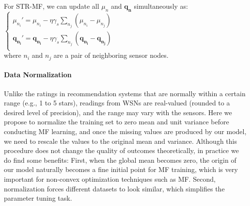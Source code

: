 For STR-MF, we can update all $\mu_n$ and $\mathbf{q_n}$ simultaneously as:\\
\indent $\begin{cases}
	\mu_{n_i}' = \mu_{n_i} - \eta \gamma_s \sum_{n_j}{(\mu_{n_i} - \mu_{n_j})}\\
	\mathbf{q_{n_i}}' = \mathbf{q_{n_i}} - \eta \gamma_s \sum_{n_j}{(\mathbf{q_{n_i}} - \mathbf{q_{n_j}})}\\
	\end{cases}$\\
where $n_i$ and $n_j$ are a pair of neighboring sensor nodes.

\paragraph*{Data Normalization}
Unlike the ratings in recommendation systems that are normally within a certain range (e.g., 1 to 5 stars), readings from WSNs are real-valued (rounded to a desired level of precision), and the range may vary with the sensors.
Here we propose to normalize the training set to zero mean and unit variance before conducting MF learning, and once the missing values are produced by our model, we need to rescale the values to the original mean and variance.
Although this procedure does not change the quality of outcomes theoretically, in practice we do find some benefits: 
First, when the global mean becomes zero, the origin of our model naturally becomes a fine initial point for MF training, which is very important for non-convex optimization techniques such as MF.
Second, normalization forces different datasets to look similar, which simplifies the parameter tuning task. 




